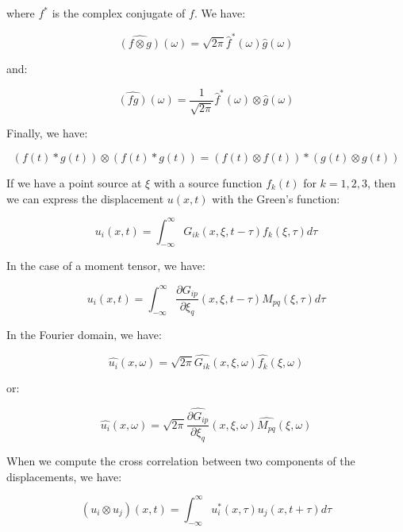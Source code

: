 \documentclass[main.tex]{subfiles}
\begin{document}
where $f^*$ is the complex conjugate of $f$. We have:

\begin{equation}
\hat{(f \otimes g)} (\omega) = \sqrt{2 \pi} \hat{f}^* (\omega) \hat{g} (\omega)
\end{equation}
 
 and:

\begin{equation}
\hat{(f g)} (\omega) = \frac{1}{\sqrt{2 \pi}} \hat{f}^* (\omega) \otimes \hat{g} (\omega)
\end{equation}

Finally, we have:

\begin{equation}
(f(t) * g(t)) \otimes (f(t) * g(t)) = (f(t) \otimes f(t)) * (g(t) \otimes g(t))
\end{equation}

If we have a point source at $\xi$ with a source function $f_k (t)$ for $k = 1, 2, 3$, then we can express the displacement $u(x, t)$ with the Green's function:

\begin{equation}
u_i(x, t) = \int_{- \infty}^{\infty} G_{ik} (x, \xi, t - \tau) f_k (\xi, \tau) d\tau
\end{equation}

In the case of a moment tensor, we have:

\begin{equation}
u_i(x, t) = \int_{- \infty}^{\infty} \frac{\partial G_{ip} }{\partial \xi_q} (x, \xi, t - \tau) M_{pq} (\xi, \tau) d\tau
\end{equation}

In the Fourier domain, we have:

\begin{equation}
\hat{u_i} (x, \omega) = \sqrt{2 \pi} \hat{G_{ik}} (x, \xi, \omega) \hat{f_k} (\xi, \omega)
\end{equation}

or:

\begin{equation}
\hat{u_i} (x, \omega) = \sqrt{2 \pi} \hat{\frac{\partial G_{ip}}{\partial \xi_q} } (x, \xi, \omega) \hat{M_{pq}} (\xi, \omega)
\end{equation}

When we compute the cross correlation between two components of the displacements, we have:

\begin{equation}
(u_i \otimes u_j) (x, t) = \int_{- \infty}^{\infty} u_i^* (x, \tau) u_j (x, t + \tau) d\tau
\end{equation}
\end{document}
